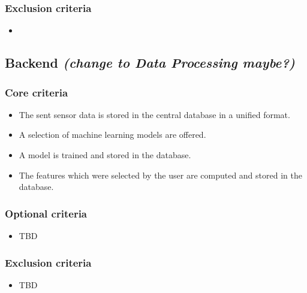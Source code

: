 \subsubsection{Exclusion criteria}
\begin{itemize}
    \item 
\end{itemize}


\subsection{Backend \emph{(change to Data Processing maybe?)}}
\subsubsection{Core criteria}
\begin{itemize}
    \item The sent sensor data is stored in the central database in a unified format.
    \item A selection of machine learning models are offered.
    \item A model is trained and stored in the database.
    \item The features which were selected by the user are computed and stored in the database.
\end{itemize}

\subsubsection{Optional criteria}
\begin{itemize}
    \item TBD
\end{itemize}

\subsubsection{Exclusion criteria}
\begin{itemize}
    \item TBD
\end{itemize}
